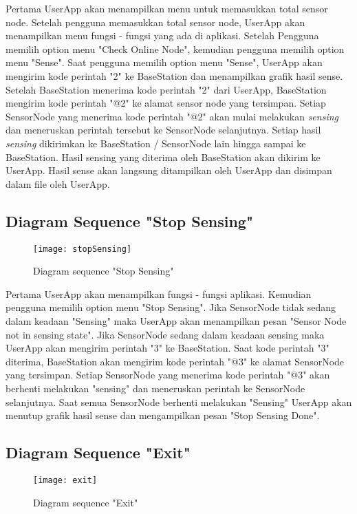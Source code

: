 Pertama UserApp akan menampilkan menu untuk memasukkan total sensor node. Setelah pengguna memasukkan total sensor node, UserApp akan menampilkan menu fungsi - fungsi yang ada di aplikasi. Setelah Pengguna memilih option menu "Check Online Node", kemudian pengguna memilih option menu "Sense". Saat pengguna memilih option menu "Sense", UserApp akan mengirim kode perintah "2" ke BaseStation dan menampilkan grafik hasil sense. Setelah BaseStation menerima kode perintah "2" dari UserApp, BaseStation mengirim kode perintah "@2" ke alamat sensor node yang tersimpan. Setiap SensorNode yang menerima kode perintah "@2" akan mulai melakukan {\it sensing} dan meneruskan perintah tersebut ke SensorNode selanjutnya. Setiap hasil {\it sensing} dikirimkan ke BaseStation / SensorNode lain hingga sampai ke BaseStation. Hasil sensing yang diterima oleh BaseStation akan dikirim ke UserApp. Hasil sense akan langsung ditampilkan oleh UserApp dan disimpan dalam file oleh UserApp.

\subsection{Diagram Sequence "Stop Sensing"}
\begin{figure}[H]
	\texttt{[image: stopSensing]}  
	\caption[Diagram sequence "Stop Sensing"]{Diagram sequence "Stop Sensing"} 
	\label{fig:stopSensing} 
\end{figure} 

Pertama UserApp akan menampilkan fungsi - fungsi aplikasi. Kemudian pengguna memilih option menu "Stop Sensing". Jika SensorNode tidak sedang dalam keadaan "Sensing" maka UserApp akan menampilkan pesan "Sensor Node not in sensing state". Jika SensorNode sedang dalam keadaan sensing maka UserApp akan mengirim perintah "3" ke BaseStation. Saat kode perintah "3" diterima, BaseStation akan mengirim kode perintah "@3" ke alamat SensorNode yang tersimpan. Setiap SensorNode yang menerima kode perintah "@3" akan berhenti melakukan "sensing" dan meneruskan perintah ke SensorNode selanjutnya. Saat semua SensorNode berhenti melakukan "Sensing" UserApp akan menutup grafik hasil sense dan mengampilkan pesan "Stop Sensing Done". 

\subsection{Diagram Sequence "Exit"}
\begin{figure}[H]
	\texttt{[image: exit]}  
	\caption[Diagram sequence "Exit"]{Diagram sequence "Exit"} 
	\label{fig:exit} 
\end{figure} 

